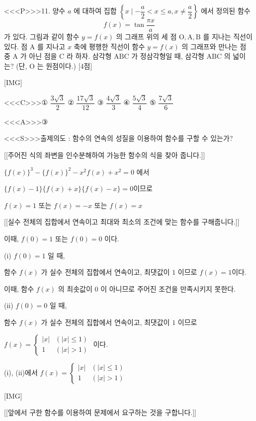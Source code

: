 \documentclass{oblivoir}
\begin{document}
<<<P>>>11. 양수 $a$ 에 대하여 집합 $\left\{x \mid-\dfrac{a}{2}< x \leq a, x \neq \dfrac{a}{2}\right\}$ 에서 정의된 함수
$$
f(x)=\tan \dfrac{\pi x}{a}
$$
가 있다. 그림과 같이 함수 $y=f(x)$ 의 그래프 위의 세 점 $\mathrm{O}, \mathrm{A}, \mathrm{B}$ 를 지나는 직선이 있다. 점 $\mathrm{A}$ 를 지나고 $x$ 축에 평행한 직선이 함수 $y=f(x)$ 의 그래프와 만나는 점 중 $\mathrm{A}$ 가 아닌 점을 $\mathrm{C}$ 라 하자. 삼각형 $\mathrm{ABC}$ 가 정삼각형일 때, 삼각형 $\mathrm{ABC}$ 의 넓이는? (단, $\mathrm{O}$ 는 원점이다.) [4점]

[IMG]

<<<C>>>① $\dfrac{3 \sqrt{3}}{2}$
② $\dfrac{17 \sqrt{3}}{12}$
③ $\dfrac{4 \sqrt{3}}{3}$
④ $\dfrac{5 \sqrt{3}}{4}$
⑤ $\dfrac{7 \sqrt{3}}{6}$


<<<A>>>③

<<<S>>>출제의도 : 함수의 연속의 성질을 이용하여 함수를 구할 수 있는가?

[[주어진 식의 좌변을 인수분해하여 가능한 함수의 식을 찾아 줍니다.]]

$\{f(x)\}^{3}-\{f(x)\}^{2}-x^{2} f(x)+x^{2}=0$ 에서

$\{f(x)-1\}\{f(x)+x\}\{f(x)-x\}=0$이므로

$f(x)=1$ 또는 $f(x)=-x$ 또는 $f(x)=x$

[[실수 전체의 집합에서 연속이고 최대와 최소의 조건에 맞는 함수를 구해줍니다.]]

이때, $f(0)=1$ 또는 $f(0)=0$ 이다.

(i) $f(0)=1$ 일 때,

함수 $f(x)$ 가 실수 전체의 집합에서 연속이고, 최댓값이 $1$ 이므로 $f(x)=1$이다.

이때, 함수 $f(x)$ 의 최솟값이 $0$ 이 아니므로 주어진 조건을 만족시키지 못한다.

(ii) $f(0)=0$ 일 때,

함수 $f(x)$ 가 실수 전체의 집합에서 연속이고, 최댓값이 $1$ 이므로

$f(x)=\begin{cases}|x| & (|x| \leq 1) \\ 1 & (|x|>1) \end{cases}$
이다.

(i), (ii)에서 $f(x)=\begin{cases} |x| & (|x| \leq 1) \\ 1 & (|x|>1)\end{cases}$

[IMG]

[[앞에서 구한 함수를 이용하여 문제에서 요구하는 것을 구합니다.]]
\end{document}

